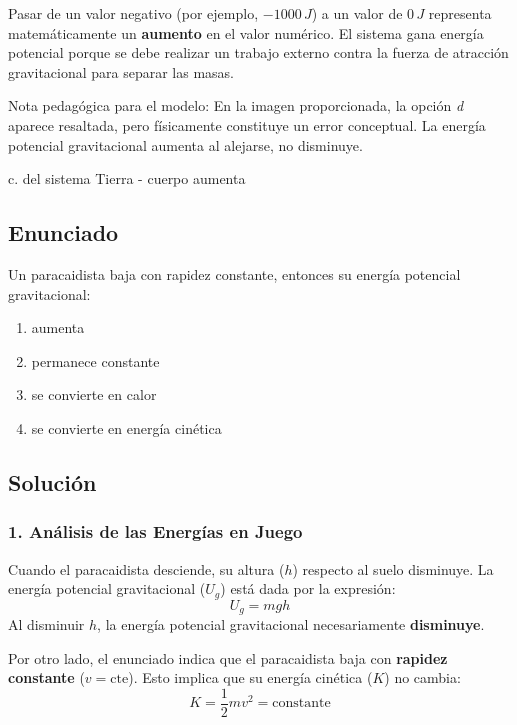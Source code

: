 \documentclass[12pt, a4paper]{article}
\begin{document}
Pasar de un valor negativo (por ejemplo, $-1000 \, \si{J}$) a un valor de $0 \, \si{J}$ representa matemáticamente un \textbf{aumento} en el valor numérico. El sistema gana energía potencial porque se debe realizar un trabajo externo contra la fuerza de atracción gravitacional para separar las masas. 

Nota pedagógica para el modelo: En la imagen proporcionada, la opción \textit{d} aparece resaltada, pero físicamente constituye un error conceptual. La energía potencial gravitacional aumenta al alejarse, no disminuye.

\begin{tcolorbox}[colback=green!5!white, colframe=green!50!black, title=Respuesta Correcta]
\centering \Large c. del sistema Tierra - cuerpo aumenta
\end{tcolorbox}

\newpage

\subsection*{Enunciado}
Un paracaidista baja con rapidez constante, entonces su energía potencial gravitacional:
\begin{enumerate}[label=\alph*.]
    \item aumenta
    \item permanece constante
    \item se convierte en calor
    \item se convierte en energía cinética
\end{enumerate}

\subsection*{Solución}

\subsubsection*{1. Análisis de las Energías en Juego}
Cuando el paracaidista desciende, su altura ($h$) respecto al suelo disminuye. La energía potencial gravitacional ($U_g$) está dada por la expresión:
$$U_g = mgh$$
Al disminuir $h$, la energía potencial gravitacional necesariamente \textbf{disminuye}.

Por otro lado, el enunciado indica que el paracaidista baja con \textbf{rapidez constante} ($v = \text{cte}$). Esto implica que su energía cinética ($K$) no cambia:
$$K = \frac{1}{2}mv^2 = \text{constante}$$
\end{document}
